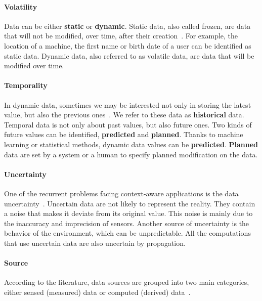 \paragraph{Volatility}
Data can be either \textbf{static} or \textbf{dynamic}.
Static data, also called frozen, are data that will not be modified, over time, after their creation~\cite{DBLP:conf/pervasive/HenricksenIR02, DBLP:journals/comsur/MakrisSS13, DBLP:journals/percom/BettiniBHINRR10}.
For example, the location of a machine, the first name or birth date of a user can be identified as static data. 
Dynamic data, also referred to as volatile data, are data that will be modified over time.

\paragraph{Temporality}
In dynamic data, sometimes we may be interested not only in storing the latest value, but also the previous ones~\cite{DBLP:conf/seke/0001FNMKT14, DBLP:conf/pervasive/HenricksenIR02}. 
We refer to these data as \textbf{historical} data.
Temporal data is not only about past values, but also future ones. 
Two kinds of future values can be identified, \textbf{predicted} and \textbf{planned}.  
Thanks to machine learning or statistical methods, dynamic data values can be \textbf{predicted}. 
\textbf{Planned} data are set by a system or a human to specify planned modification on the data.

\paragraph{Uncertainty}
One of the recurrent problems facing context-aware applications is the data uncertainty~\cite{DBLP:conf/dagstuhl/LemosGMSALSTVVWBBBBCDDEGGGGIKKLMMMMMNPPSSSSTWW10, DBLP:conf/pervasive/HenricksenIR02, DBLP:journals/comsur/MakrisSS13, DBLP:journals/percom/BettiniBHINRR10}.
Uncertain data are not likely to represent the reality. They contain a noise that makes it deviate from its original value.
This noise is mainly due to the inaccuracy and imprecision of sensors.
Another source of uncertainty is the behavior of the environment, which can be unpredictable.
All the computations that use uncertain data are also uncertain by propagation.

\paragraph{Source}
According to the literature, data sources are grouped into two main categories, either sensed (measured) data or computed (derived) \linebreak data~\cite{DBLP:journals/comsur/PereraZCG14}.

